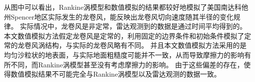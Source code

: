 \documentclass{ctexart}
\begin{document}
从图中可以看出，Rankine涡模型和数值模拟的结果都较好地模拟了美国南达科他州Spencer地区实际发生的龙卷风，能反映出龙卷风切向速度随其半径的变化规律。
实际情况中，龙卷风是非定常，雷达观测到的数据是通过时间平均得到的。
本文数值模拟方法假定龙卷风是定常的，利用固定的边界条件和初始条件模拟了定常的龙卷风涡结构，与实际的龙卷风略有不同。
并且本文数值模拟方法采用的是均匀沙粒状的地表面，与实际地面粗糙度可能并不一致，从而导致摩擦力的影响有所不同，而Rankine涡模型甚至没有考虑摩擦力的影响。
由于这些偏差的存在，使得数值模拟结果不可能完全与Rankine涡模型以及雷达观测的数据一致。




\printbibliography
\end{document}
